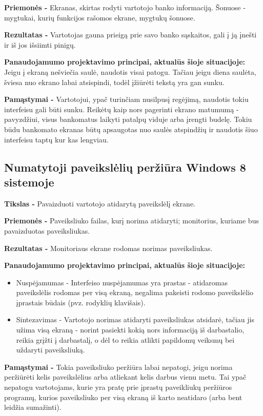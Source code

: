 ﻿\documentclass[a4paper, 12pt]{article}
\begin{document}
		\textbf{Priemonės -}
		Ekranas, skirtas rodyti vartotojo banko informaciją.
		Šonuose - mygtukai, kurių funkcijos rašomos ekrane, mygtukų šonuose.

		\textbf{Rezultatas -}
		Vartotojas gauna prieigą prie savo banko sąskaitos, gali į ją įnešti ir iš jos išsiimti pinigų.

		\textbf{Panaudojamumo projektavimo principai, aktualūs šioje situacijoje:}\\
		Jeigu į ekraną nešviečia saulė, naudotis visai patogu.
		Tačiau jeigu diena saulėta, šviesa nuo ekrano labai atsispindi, todėl įžiūrėti tekstą yra gan sunku.

		\textbf{Pamąstymai -}
		Vartotojui, ypač turinčiam nusilpusį regėjimą, naudotis tokiu interfeisu gali būti sunku.
		Reikėtų kaip nors pagerinti ekrano matumumą - pavyzdžiui, visus bankomatus laikyti patalpų viduje arba įrengti budelę.
		Tokiu būdu bankomato ekranas būtų apsaugotas nuo saulės atspindžių ir naudotis šiuo interfeisu taptų kur kas lengviau.

		
	\subsection{Numatytoji paveikslėlių peržiūra Windows 8 sistemoje}
		\textbf{Tikslas -}
		Pavaizduoti vartotojo atidarytą paveikslėlį ekrane.
		
		\textbf{Priemonės -}
		Paveiksliuko failas, kurį norima atidaryti; monitorius, kuriame bus pavaizduotas paveiksliukas.

		\textbf{Rezultatas -}
		Monitoriaus ekrane rodomas norimas paveiksliukas.

		\textbf{Panaudojamumo projektavimo principai, aktualūs šioje situacijoje:}
		\begin{itemize}
		\item Nuspėjamumas - Interfeiso nuspėjamumas yra prastas - atidaromas paveikslėlis rodomas per visą ekraną, negalima pakeisti rodomo paveikslėlio įprastais būdais (pvz. rodyklių klavišais).
		\item Sintezavimas - Vartotojo norimas atidaryti paveiksliukas atsidarė, tačiau jis užima visą ekraną - norint pasiekti kokią nors informaciją iš darbastalio, reikia grįžti į darbastalį, o dėl to reikia atlikti papildomų veiksmų bei uždaryti paveiksliuką.
		\end{itemize}

		\textbf{Pamąstymai -}
		Tokia paveiksliuko peržiūra labai nepatogi, jeigu norima peržiūrėti kelis paveikslėlius arba atliekant kelis darbus vienu metu.
		Tai ypač nepatogu vartotojams, kurie yra pratę prie įprastų paveikliukų peržiūros programų, kurios paveiksliuko per visą ekraną iš karto neatidaro (arba bent leidžia sumažinti).
\end{document}
